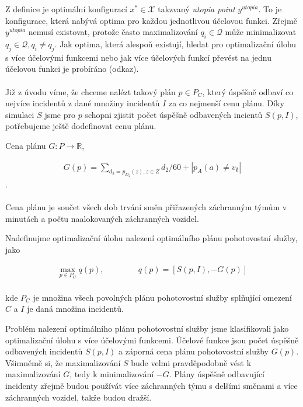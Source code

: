Z definice je optimální konfigurací $x^* \in \mathcal{X}$ takzvaný \textit{utopia point} $y^{utopia}$.
To je konfigurace, která nabývá optima pro každou jednotlivou účelovou funkci.
Zřejmě $y^{utopia}$ nemusí existovat, protože často maximalizování $q_i \in \mathcal{Q}$ může minimalizovat $q_j \in \mathcal{Q}, q_i \neq q_j$.
Jak optima, která alespoň existují, hledat pro optimalizační úlohu s více účelovými funkcemi nebo jak více účelových funkcí převést na jednu účelovou funkci je probíráno (odkaz). %
\\
\\
Již z úvodu víme, že chceme nalézt takový plán $p \in P_C$, který úspěšně odbaví co nejvíce incidentů z dané množiny incidentů $I$ za co nejmenší cenu plánu.
Díky simulaci $S$ jsme pro $p$ schopni zjistit počet úspěšně odbavených incientů $S(p, I)$, potřebujeme ještě dodefinovat cenu plánu.
\\
\begin{definice}
  Cena plánu $G \colon P \rightarrow \mathbb{R}$,

  \begin{align}
    G(p) = \sum_{d_2 = p_{D_2}(z), z \in Z} d_2 / 60 + |p_{A}(a) \neq v_{\emptyset}|
  \end{align}
  .
  \\
  \\
  Cena plánu je součet všech dob trvání směn přiřazených záchranným týmům v minutách a počtu naalokovaných záchranných vozidel.
\end{definice}

Nadefinujme optimalizační úlohu nalezení optimálního plánu pohotovostní služby, jako
\\
\begin{definice}
  \begin{align}
    \max_{p \in P_C} q(p), \hspace{50pt} q(p) = [S(p, I), -G(p)]
  \end{align}
  \\
  kde $P_C$ je množina všech povolných plánu pohotovostní služby splňující omezení $C$ a $I$ je daná množina incidentů.
\end{definice}

Problém nalezení optimálního plánu pohotovostní služby jsme klasifikovali jako optimalizační úlohu s více účelovými funkcemi.
Účelové funkce jsou počet úspěšně odbavených incidentů $S(p, I)$ a záporná cena plánu pohotovostní služby $G(p)$.
Všimněmě si, že maximalizování $S$ bude velmi pravděpodobně vést k maximalizování $G$, tedy k minimalizování $-G$.
Plány úspěšně odbavující incidenty zřejmě budou používát více záchranných týmu s delšími směnami a více záchranných vozidel, takže budou dražší.

